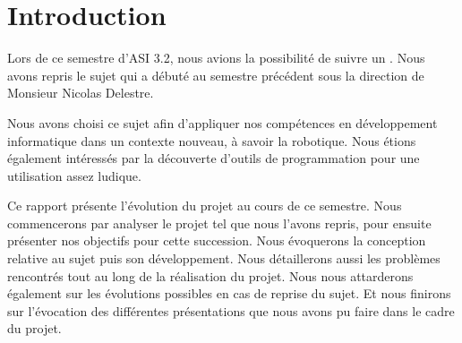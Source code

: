 \section{Introduction}
\label{sec:Introduction}

\par Lors de ce semestre d'ASI 3.2, nous avions la possibilité de suivre un \pao.
Nous avons repris le sujet \projet qui a débuté au semestre précédent sous la direction de Monsieur Nicolas Delestre.

\par Nous avons choisi ce sujet afin d'appliquer nos compétences en développement informatique dans un contexte nouveau, à savoir la robotique.
Nous étions également intéressés par la découverte d'outils de programmation pour une utilisation assez ludique.

\par Ce rapport présente l'évolution du projet au cours de ce semestre.
Nous commencerons par analyser le projet tel que nous l'avons repris, pour ensuite présenter nos objectifs pour cette succession.
Nous évoquerons la conception relative au sujet puis son développement. Nous détaillerons aussi les problèmes rencontrés tout au long de la réalisation du projet.
Nous nous attarderons également sur les évolutions possibles en cas de reprise du sujet.
Et nous finirons sur l'évocation des différentes présentations que nous avons pu faire dans le cadre du projet.

\pagebreak
